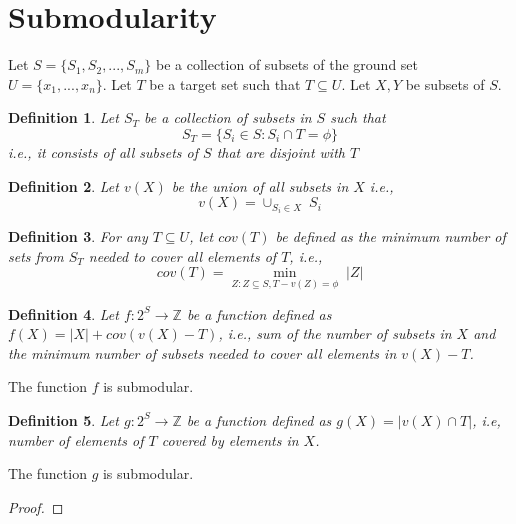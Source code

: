 \documentclass[twoside, leqno, twocolumn]{article}
\newtheorem{definition}{Definition}[section]
\begin{document}
\newpage

\section{Submodularity}

Let $S = \{S_1, S_2, ..., S_m\}$ be a collection of subsets of the ground set $U = \{x_1,  ..., x_n \}$.  Let $T$ be a target set such that $T \subseteq U$. Let $X, Y$ be subsets of $S$.

\begin{definition}
Let $S_T$ be a collection of subsets in $S$ such that 
\begin{equation}
	S_T = \{ S_i \in S : S_i \cap T = \phi \} \nonumber
\end{equation}
i.e., it consists of all subsets of $S$ that are disjoint with $T$
\end{definition}
\begin{definition}
 Let $v(X)$ be the union of all subsets in $X$ i.e.,
 \begin{equation}
 		v(X) = \cup_{S_i \in X} \; S_i  \nonumber
 \end{equation}
\end{definition}
\begin{definition}
	For any $T \subseteq U$, let  $cov(T)$ be defined as the minimum number of sets from $S_T$ needed to cover all elements of $T$, i.e.,
	\begin{equation}
		 	cov(T) = \min_{Z: Z \subseteq S, T- v(Z) = \phi} \; |Z|
	\end{equation}
\end{definition}
\begin{definition}
	Let $f \colon 2^S \to \mathbb{Z}$ be a function defined as $f(X) = |X| + cov( v(X) - T)$, i.e., sum of the number of subsets in $X$ and the minimum number of subsets needed to cover all elements in $v(X) - T$.
\end{definition}
\begin{lemma}
	The function $f$ is submodular.
\end{lemma}

\begin{definition}
	Let $g \colon 2^S \to \mathbb{Z}$ be a function defined as $g(X) = | v(X) \cap T|$, i.e, number of elements of $T$ covered by elements in $X$. 
\end{definition}

\begin{lemma}
	The function $g$ is submodular.
\end{lemma}
\begin{proof}

\end{proof}
\newpage
 


\end{document}
